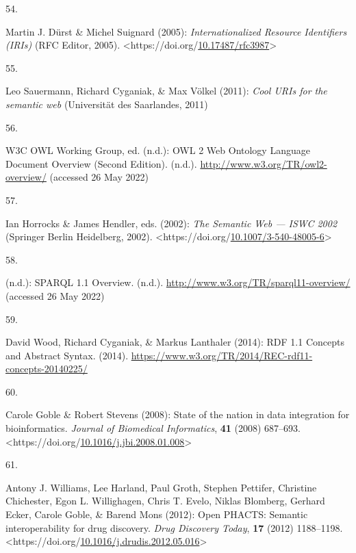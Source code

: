 \begin{thebibliography}{9}
\hypertarget{ref-rfc3987}{}
54.

Martin J. Dürst \& Michel Suignard (2005): \emph{Internationalized
{Resource Identifiers} ({IRIs})} ({RFC Editor}, 2005).
\textless https://doi.org/\href{https://doi.org/10.17487/rfc3987}{10.17487/rfc3987}\textgreater{}

\hypertarget{ref-sauermannCoolURIsSemantic2011}{}
55.

Leo Sauermann, Richard Cyganiak, \& Max Völkel (2011): \emph{Cool {URIs}
for the semantic web} ({Universität des Saarlandes}, 2011)

\hypertarget{ref-w3-owl2-overview}{}
56.

W3C OWL Working Group, ed. (n.d.): {OWL} 2 {Web Ontology Language
Document Overview} ({Second Edition}). (n.d.).
\url{http://www.w3.org/TR/owl2-overview/} (accessed 26 May 2022)

\hypertarget{ref-horrocksSemanticWebISWC2002}{}
57.

Ian Horrocks \& James Hendler, eds. (2002): \emph{The {Semantic Web} ---
{ISWC} 2002} ({Springer Berlin Heidelberg}, 2002).
\textless https://doi.org/\href{https://doi.org/10.1007/3-540-48005-6}{10.1007/3-540-48005-6}\textgreater{}

\hypertarget{ref-w3-sparql11-overview}{}
58.

(n.d.): {SPARQL} 1.1 {Overview}. (n.d.).
\url{http://www.w3.org/TR/sparql11-overview/} (accessed 26 May 2022)

\hypertarget{ref-w3-rdf11-concepts}{}
59.

David Wood, Richard Cyganiak, \& Markus Lanthaler (2014): {RDF 1.1
Concepts and Abstract Syntax}. (2014).
\url{https://www.w3.org/TR/2014/REC-rdf11-concepts-20140225/}

\hypertarget{ref-gobleStateNationData2008c}{}
60.

Carole Goble \& Robert Stevens (2008): State of the nation in data
integration for bioinformatics. \emph{Journal of Biomedical
Informatics}, \textbf{41} (2008) 687--693.
\textless https://doi.org/\href{https://doi.org/10.1016/j.jbi.2008.01.008}{10.1016/j.jbi.2008.01.008}\textgreater{}

\hypertarget{ref-williamsOpenPHACTSSemantic2012c}{}
61.

Antony J. Williams, Lee Harland, Paul Groth, Stephen Pettifer, Christine
Chichester, Egon L. Willighagen, Chris T. Evelo, Niklas Blomberg,
Gerhard Ecker, Carole Goble, \& Barend Mons (2012): Open {PHACTS}:
Semantic interoperability for drug discovery. \emph{Drug Discovery
Today}, \textbf{17} (2012) 1188--1198.
\textless https://doi.org/\href{https://doi.org/10.1016/j.drudis.2012.05.016}{10.1016/j.drudis.2012.05.016}\textgreater{}


\end{thebibliography}
